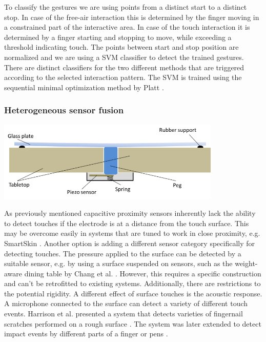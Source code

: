 To classify the gestures we are using points from a distinct start to a distinct stop. In case of the free-air interaction this is determined by the finger moving in a constrained part of the interactive area. In case of the touch interaction it is determined  by a finger starting and stopping to move, while exceeding a threshold indicating touch. The points between start and stop position are normalized and we are using a SVM classifier to detect the trained gestures. There are distinct classifiers for the two different methods that are triggered according to the selected interaction pattern. The SVM is trained using the sequential minimal optimization method by Platt \cite{platt1999fast}.

\subsubsection{Heterogeneous sensor fusion}
\begin{minipage}{\linewidth}
\centering
\includegraphics[width=0.8\textwidth]{images/captap_peg}
\label{fig:captap_peg}
\end{minipage}

As previously mentioned capacitive proximity sensors inherently lack the ability to detect touches if the electrode is at a distance from the touch surface. This may be overcome easily in systems that are tuned to work in close proximity, e.g. SmartSkin \cite{rekimoto2002smartskin}. Another option is adding a different sensor category specifically for detecting touches. The pressure applied to the surface can be detected by a suitable sensor, e.g. by using a surface suspended on sensors, such as the weight-aware dining table by Chang et al. \cite{chang2006diet}. However, this requires a specific construction and can't be retrofitted to existing systems. Additionally, there are restrictions to the potential rigidity. A different effect of surface touches is the acoustic response. A microphone connected to the surface can detect a variety of different touch events. Harrison et al. presented a system that detects varieties of fingernail scratches performed on a rough surface \cite{harrison2008scratch}. The system was later extended to detect impact events by different parts of a finger or pens \cite{harrison2011tapsense}. 

